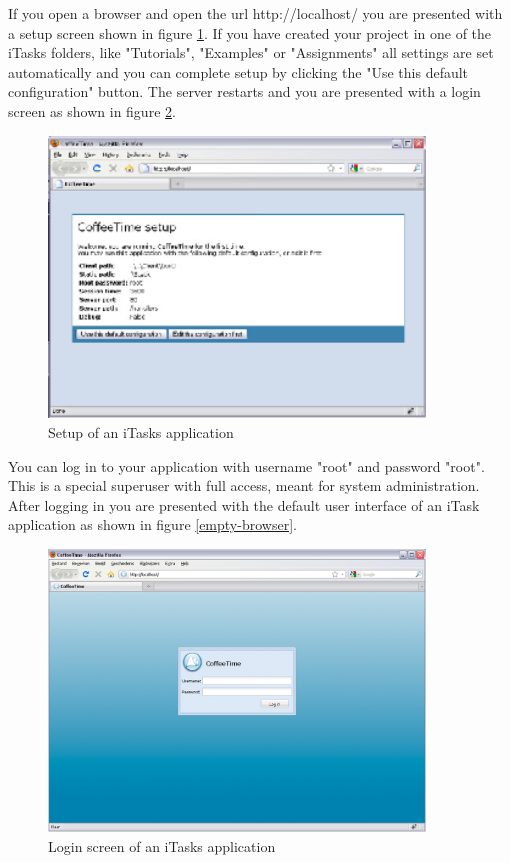 \documentclass[a4paper,11pt]{article}
\begin{document}
If you open a browser and open the url http://localhost/ you are presented with a setup screen shown in figure \ref{setup-browser}. If you have created your project in one of the iTasks folders, like "Tutorials", "Examples" or "Assignments" all settings are set automatically and you can complete setup by clicking the "Use this default configuration" button. The server restarts and you are presented with a login screen as shown in figure \ref{login-browser}.
\begin{figure}[h]
\centerline{\includegraphics[width=10cm]{GettingStarted-img/setup-browser.eps}}
\caption{Setup of an iTasks application} \label{setup-browser}
\end{figure}
You can log in to your application with username "root" and password "root". This is a special superuser with full access, meant for system administration. After logging in you are presented with the default user interface of an iTask application as shown in figure \ref{empty-browser}.
\begin{figure}[h]
\centerline{\includegraphics[width=10cm]{GettingStarted-img/login-browser.eps}}
\caption{Login screen of an iTasks application} \label{login-browser}
\end{figure}
\end{document}
